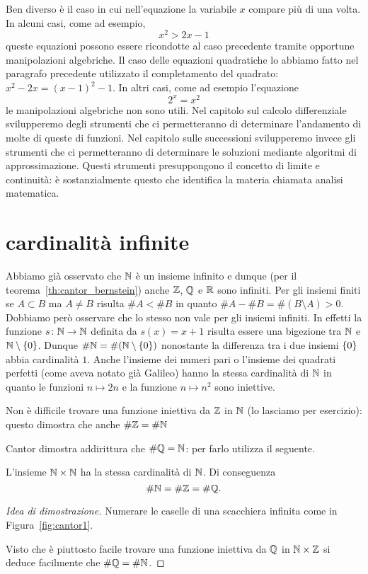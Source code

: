 Ben diverso è il caso in cui nell'equazione la variabile $x$ 
compare più di una volta.
In alcuni casi, come ad esempio,
\[
  x^2 > 2x - 1  
\]
queste equazioni 
possono essere ricondotte al caso precedente tramite 
opportune manipolazioni algebriche.
Il caso delle equazioni quadratiche lo abbiamo 
fatto nel paragrafo precedente utilizzato il completamento 
del quadrato: $x^2-2x = (x-1)^2-1$. 
In altri casi, come ad esempio l'equazione
\[
  2^x = x^2
\]  
le manipolazioni algebriche non sono utili.
Nel capitolo sul calcolo differenziale svilupperemo degli strumenti 
che ci permetteranno di determinare l'andamento di molte di queste 
di funzioni. 
Nel capitolo sulle successioni svilupperemo invece gli strumenti 
che ci permetteranno di determinare le soluzioni mediante 
algoritmi di approssimazione.
Questi strumenti presuppongono il concetto 
di limite e continuità: è sostanzialmente questo che identifica 
la materia chiamata analisi matematica.

\section{cardinalità infinite}

Abbiamo già osservato che ${\mathbb N}$ è un insieme infinito e dunque (per il teorema~\ref{th:cantor_bernstein})
anche ${\mathbb Z}$, ${\mathbb Q}$ e ${\mathbb R}$ sono infiniti.
Per gli insiemi finiti se $A\subset B$ ma $A\neq B$ risulta $\#A < \# B$
in quanto $\#A - \#B = \#(B\setminus A) > 0$. 
Dobbiamo però osservare che lo stesso non vale per gli insiemi infiniti.
In effetti la funzione $s\colon {\mathbb N} \to {\mathbb N}$ definita da $s(x)=x+1$
risulta essere una bigezione tra ${\mathbb N}$ e ${\mathbb N}\setminus{\left\{ 0 \right\}}$. 
Dunque $\#{\mathbb N} = \#({\mathbb N}\setminus{\left\{ 0 \right\}})$ 
nonostante la differenza tra i due insiemi ${\left\{ 0 \right\}}$ abbia 
cardinalità $1$. 
Anche l'insieme dei numeri pari o l'insieme 
dei quadrati perfetti (come aveva notato già Galileo)
hanno la stessa cardinalità di ${\mathbb N}$ in quanto le funzioni $n\mapsto 2n$
e la funzione $n\mapsto n^2$ sono iniettive.

Non è difficile trovare una funzione iniettiva da ${\mathbb Z}$ in ${\mathbb N}$
(lo lasciamo per esercizio): questo dimostra che anche $\#{\mathbb Z} = \# {\mathbb N}$

Cantor dimostra addirittura che $\#{\mathbb Q} = {\mathbb N}$: per farlo utilizza il seguente.

\begin{theorem}
\label{th:Cantor_primo}%
%
L'insieme ${\mathbb N} \times {\mathbb N}$ ha la stessa cardinalità di ${\mathbb N}$. Di conseguenza
\[
  \# {\mathbb N} = \# {\mathbb Z} = \# {\mathbb Q}.
  \]
\end{theorem}
%
\begin{proof}[Idea di dimostrazione]
  Numerare le caselle di una scacchiera infinita
  come in Figura~\ref{fig:cantor1}.
  
  Visto che è piuttosto facile trovare una funzione iniettiva 
  da ${\mathbb Q}$ in ${\mathbb N} \times {\mathbb Z}$ si deduce facilmente che $\#{\mathbb Q} = \#{\mathbb N}$.
\end{proof}

